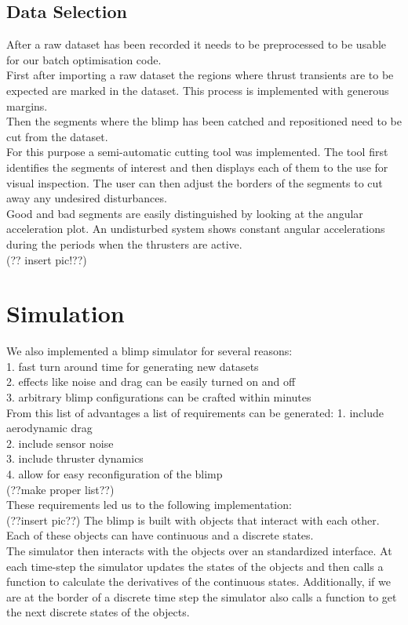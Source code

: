 \subsection{Data Selection}
\label{sub:data_selection}
After a raw dataset has been recorded it needs to be preprocessed to be usable for our batch optimisation code.\\
First after importing a raw dataset the regions where thrust transients are to be expected are marked in the dataset.
This process is implemented with generous margins. \\
Then the segments where the blimp has been catched and repositioned need to be cut from the dataset. \\
For this purpose a semi-automatic cutting tool was implemented. 
The tool first identifies the segments of interest and then displays each of them to the use for visual inspection.
The user can then adjust the borders of the segments to cut away any undesired disturbances. \\
Good and bad segments are easily distinguished by looking at the angular acceleration plot.
An undisturbed system shows constant angular accelerations during the periods when the thrusters are active. \\

(?? insert pic!??)

\section{Simulation}
\label{sec:simulation}
We also implemented a blimp simulator for several reasons:\\
1. fast turn around time for generating new datasets \\
2. effects like noise and drag can be easily turned on and off\\
3. arbitrary blimp configurations can be crafted within minutes\\
From this list of advantages a list of requirements can be generated:
1. include aerodynamic drag\\
2. include sensor noise\\
3. include thruster dynamics\\
4. allow for easy reconfiguration of the blimp\\
(??make proper list??)\\
These requirements led us to the following implementation:\\
(??insert pic??)
The blimp is built with objects that interact with each other.
Each of these objects can have continuous and a discrete states.\\
The simulator then interacts with the objects over an standardized interface.
At each time-step the simulator updates the states of the objects and then calls a function to calculate the derivatives of the continuous states.
Additionally, if we are at the border of a discrete time step the simulator also calls a function to get the next discrete states of the objects.\\

